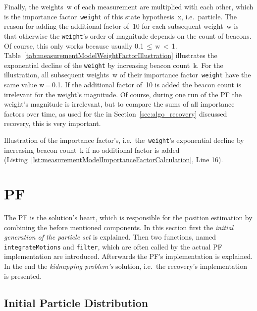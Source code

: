 Finally, the weights~w of each measurement are multiplied with each other, which is the importance factor~\texttt{weight} of this state hypothesis~x, i.e.\ particle. The reason for adding the additional factor of~10 for each subsequent weight~w is that otherwise the \texttt{weight}'s order of magnitude depends on the count of beacons. Of course, this only works because usually 0.1\,$\leq$\,w\,$<$\,1. Table~\ref{tab:measurementModelWeightFactorIllustration} illustrates the exponential decline of the \texttt{weight} by increasing beacon count~k. For the illustration, all subsequent weights~w of their importance factor~\texttt{weight} have the same value w\,=\,0.1. If the additional factor of~10 is added the beacon count is irrelevant for the weight's magnitude. Of course, during one run of the \acl{PF} the weight's magnitude is irrelevant, but to compare the sums of all importance factors over time, as used for the in Section~\ref{sec:algo_recovery} discussed recovery, this is very important.

\begin{table}
	
	\caption{Illustration of the importance factor's, i.e.\ the~\texttt{weight}'s exponential decline by increasing beacon count~k if no additional factor is added (Listing~\ref{lst:measurementModelImportanceFactorCalculation}, Line 16). }
	\label{tab:measurementModelWeightFactorIllustration}
\end{table}


\section{\acl{PF}}\label{sec:algo_pf}
The \acl{PF} is the solution's heart, which is responsible for the position estimation by combining the before mentioned components. In this section first the \emph{initial generation of the particle set} is explained. Then two functions, named \texttt{integrateMotions} and \texttt{filter}, which are often called by the actual \ac{PF} implementation are introduced. Afterwards the \ac{PF}'s implementation is explained. In the end the \emph{kidnapping problem's} solution, i.e.\ the recovery's implementation is presented.


\subsection{Initial Particle Distribution}\label{sec:algo_initial}

